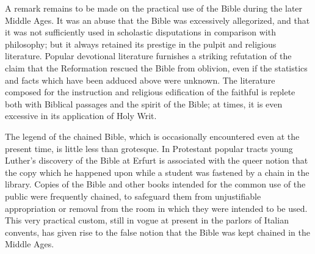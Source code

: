 A remark remains to be made on the practical use of the Bible during the
later Middle Ages. It was an abuse that the Bible was excessively allegorized,
and that it was not sufficiently used in scholastic
disputations in comparison with philosophy; but it always retained its
prestige in the pulpit and religious literature. Popular devotional literature
furnishes a striking refutation of the claim that the Reformation rescued
the Bible from oblivion, even if the statistics and facts
which have been adduced above were unknown. The literature composed for
the instruction and religious edification of the faithful is
replete both with Biblical passages and the spirit of the Bible; at times,
it is even excessive in its application of Holy Writ.

The legend of the chained Bible, which is occasionally encountered even
at the present time, is little less than grotesque. In Protestant popular tracts
young Luther’s discovery of the Bible at Erfurt is associated with the queer
notion that the copy which he happened upon while a student was
fastened by a chain in the library. Copies of the Bible and other books intended
for the common use of the public were frequently chained, to safeguard
them from unjustifiable appropriation or removal from the room in
which they were intended to be used. This very practical custom, still in
vogue at present in the parlors of Italian convents, has given rise to the
false notion that the Bible was kept chained in the Middle Ages.
